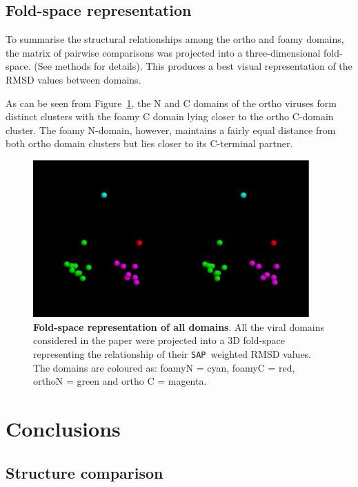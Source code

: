\documentclass{bmcart}
\newcommand{\SAP}{{\tt SAP}}
\newcommand{\Fig}[1]{Figure~\ref{Fig:#1}}
\begin{document}
\subsection*{Fold-space representation}

To summarise the structural relationships among the ortho and foamy domains, the matrix
of pairwise comparisons was projected into a three-dimensional fold-space.  (See methods
for details).   This produces a best visual representation of the RMSD values between domains.

As can be seen from \Fig{space}, the N and C domains of the ortho viruses form distinct
clusters with the foamy C domain lying closer to the ortho C-domain cluster.   The foamy
N-domain, however, maintains a fairly equal distance from both ortho domain clusters but
lies closer to its C-terminal partner.

\begin{figure}
\centering
\includegraphics[width=300pt]{foldspace-space.eps}
\begin{footnotesize}
\caption{
\label{Fig:space}
{\bf Fold-space representation of all domains}.
All the viral domains considered in the paper were projected into a 3D fold-space representing
the relationship of their \SAP\ weighted RMSD values.   The domains are coloured as:
foamyN = cyan, foamyC = red, orthoN = green and ortho C = magenta.
}
\end{footnotesize}
\end{figure}

\section*{Conclusions}

\subsection*{Structure comparison}
\end{document}
